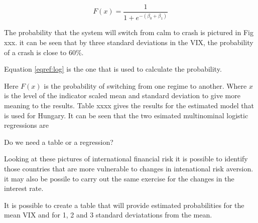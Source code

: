 \documentclass[12pt, a4paper, oneside]{article} %
\begin{document}
\begin{equation}
\label{eqref:log}
F(x) = \frac{1}{1 + e^{-(\beta_0 + \beta_1)}}
\end{equation}

The probability that the system will switch from calm to crash is pictured in Fig xxx.  it can be seen that by three standard deviations in the VIX, the probability of a crash is close to 60\%.  

Equation \ref{eqref:log} is the one that is used to calculate the probability. 

Here $F(x)$ is the probability of switching from one regime to another.  Where $x$ is the level of the indicator scaled mean and standard deviation to give more meaning to the results.  Table xxxx gives the results for the estimated model that is used for Hungary. It can be seen that the two esimated multinominal logistic regressions are 

Do we need a table or a regression? 

Looking at these pictures of international financial risk it is possible to identify those countries that are more vulnerable to changes in intenational risk aversion. it may also be possile to carry out the same exercise for the changes in the interest rate.  

It is possible to create a table that will provide estimated probabilities for the mean VIX and for 1, 2 and 3 standard deviatations from the mean. 
\end{document}
